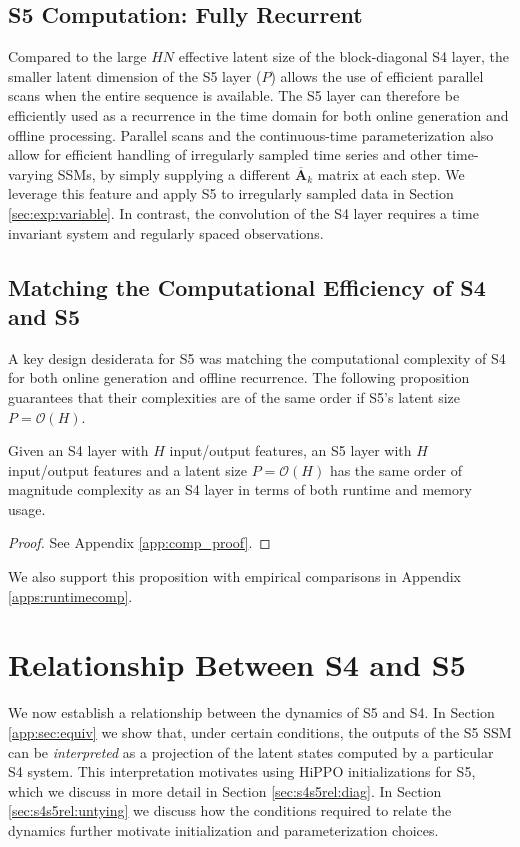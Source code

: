 \subsection{S5 Computation: Fully Recurrent} 
\label{subsec:simplecomp}
Compared to the large $HN$ effective latent size of the block-diagonal S4 layer, the smaller latent dimension of the S5 layer ($P$) allows the use of efficient parallel scans when the entire sequence is available.  The S5 layer can therefore be efficiently used as a recurrence in the time domain for both online generation and offline processing.  Parallel scans and the continuous-time parameterization also allow for efficient handling of irregularly sampled time series and other time-varying SSMs, by simply supplying a different $\overline{\mathbf{A}}_k$ matrix at each step.  We leverage this feature and apply S5 to irregularly sampled data in Section \ref{sec:exp:variable}.  In contrast, the convolution of the S4 layer requires a time invariant system and regularly spaced observations.

\subsection{Matching the Computational Efficiency of S4 and S5} A key design desiderata for S5 was matching the computational complexity of S4 for both online generation and offline recurrence. The following proposition guarantees that their complexities are of the same order if S5's latent size $P=\mathcal{O}(H)$.

\begin{prop} 
\label{prop:efficiency}
Given an S4 layer with $H$ input/output features, an S5 layer with $H$ input/output features and a latent size $P=\mathcal{O}(H)$ has the same order of magnitude complexity as an S4 layer in terms of both runtime and memory usage. 
\end{prop}

\begin{proof}
See Appendix \ref{app:comp_proof}.
\end{proof}

We also support this proposition with empirical comparisons in Appendix \ref{apps:runtimecomp}.

\section{Relationship Between S4 and S5}
\label{sec:s4s5rel}
We now establish a relationship between the dynamics of S5 and S4.  In Section \ref{app:sec:equiv} we show that, under certain conditions, the outputs of the S5 SSM can be \emph{interpreted} as a projection of the latent states computed by a particular S4 system. This interpretation motivates using HiPPO initializations for S5, which we discuss in more detail in Section \ref{sec:s4s5rel:diag}.  In Section \ref{sec:s4s5rel:untying} we discuss how the conditions required to relate the dynamics further motivate initialization and parameterization choices.  

